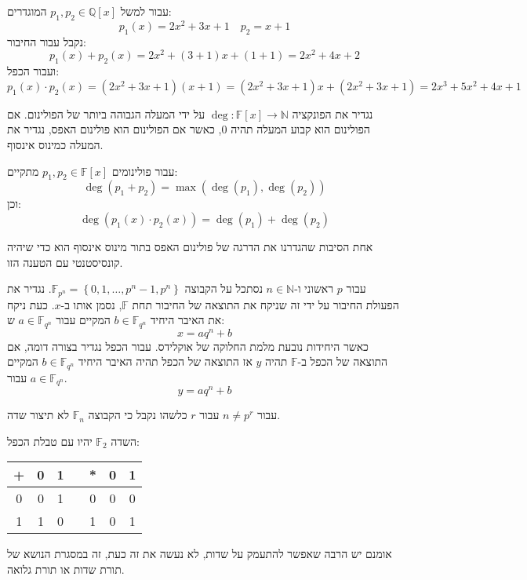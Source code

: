 \documentclass{tstextbook}
\begin{document}
\begin{example}
עבור למשל \(p_{1},p_{2} \in \mathbb{Q}[x]\) המוגדרים:
$$p_{1}(x)=2x^2+3x+1\quad p_{2}=x+1$$
נקבל עבור החיבור:
$$p_{1}(x)+p_{2}(x)=2x^{2}+(3+1)x+(1+1)=2x^{2}+4x+2$$
ועבור הכפל:
$$p_{1}(x)\cdot p_{2}(x)=(2x^{2}+3x+1)(x+1)=(2x^{2}+3x+1)x+(2x^{2}+3x+1)=2x^{3}+5x^{2}+4x+1$$

\end{example}
\begin{definition}
נגדיר את הפונקציה \(\deg:\mathbb{F} [x]\to \mathbb{N}\) על ידי המעלה הגבוהה ביותר של הפולינום. אם הפולינום הוא קבוע המעלה תהיה 0, כאשר אם הפולינום הוא פולינום האפס, נגדיר את המעלה כמינוס אינסוף.

\end{definition}
\begin{proposition}
עבור פולינומים \(p_{1},p_{2} \in \mathbb{F} [x]\) מתקיים:
$$\deg(p_{1}+p_{2})=\max \left( \deg(p_{1}) ,\deg(p_{2})  \right) $$
וכן:
$$\deg\left( p_{1}(x)\cdot p_{2}(x) \right) =\deg(p_{1}) +\deg(p_{2}) $$

\end{proposition}
\begin{remark}
אחת הסיבות שהגדרנו את הדרגה של פולינום האפס בתור מינוס אינסוף הוא כדי שיהיה קונסיסטנטי עם הטענה הזו.

\end{remark}
\begin{definition}
עבור \(p\) ראשוני ו-\(n \in \mathbb{N}\) נסתכל על הקבוצה \(\mathbb{F} _{p^{n}}=\left\{  0,1,\dots,p^{n}-1,p^{n}  \right\}\). נגדיר את הפעולת החיבור על ידי זה שניקח את התוצאה של החיבור תחת \(\mathbb{F}\), נסמן אותו ב-\(x\). כעת ניקח את האיבר היחיד \(b\in \mathbb{F} _{q^{n}}\) המקיים עבור \(a \in \mathbb{F}_{q^{n}}\) ש:
$$x=aq^{n}+b$$
כאשר היחידות נובעת מלמת החלוקה של אוקלידס. עבור הכפל נגדיר בצורה דומה, אם התוצאה של הכפל ב-\(\mathbb{F}\) תהיה \(y\) אז התוצאה של הכפל תהיה האיבר היחיד \(b \in \mathbb{F}_{q^{n}}\) המקיים עבור \(a \in \mathbb{F} _{q^{n}}\).
$$y=aq^{n}+b$$

\end{definition}
\begin{proposition}
עבור \(n \neq p^{r}\) עבור \(r\) כלשהו נקבל כי הקבוצה \(\mathbb{F} _n\) לא תיצור שדה.

\end{proposition}
\begin{example}
השדה \(\mathbb{F} _2\) יהיו עם טבלת הכפל:

  \begin{table}[htbp]
    \centering
    \begin{tabular}{|ccccccc|}
      \hline
      + & 0 & 1 &  & * & 0 & 1 \\ \hline
      0 & 0 & 1 &  & 0 & 0 & 0 \\ \hline
      1 & 1 & 0 &  & 1 & 0 & 1 \\ \hline
    \end{tabular}
  \end{table}
\end{example}
אומנם יש הרבה שאפשר להתעמק על שדות, לא נעשה את זה כעת, זה במסגרת הנושא של תורת שדות או תורת גלואה.
\end{document}
